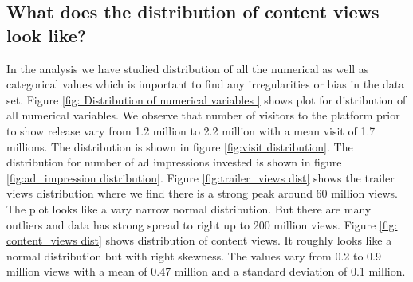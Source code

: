 \documentclass[12pt,a4paper]{style}
\begin{document}
\subsection{What does the distribution of content views look like?}
In the analysis we have studied distribution of all the numerical as well as categorical values which is important to find any irregularities or bias in the data set. Figure \ref{fig: Distribution of numerical variables } shows plot for distribution of all numerical variables. We observe that number of visitors to the platform prior to show release vary from 1.2 million to 2.2 million with a mean visit of 1.7 millions. The distribution is shown in figure \ref{fig:visit distribution}. The distribution for number of ad impressions invested is shown in figure \ref{fig:ad_impression distribution}. Figure \ref{fig:trailer_views dist} shows the trailer views distribution where we find there is a strong peak around 60 million views. The plot looks like a vary narrow normal distribution. But there are many outliers and data has strong spread to right up to 200 million views. Figure \ref{fig: content_views dist} shows distribution of content views. It roughly looks like a normal distribution but with right skewness. The values vary from 0.2 to 0.9 million views with a mean of 0.47 million and a standard deviation of 0.1 million.		  
\end{document}
